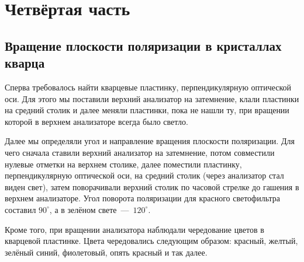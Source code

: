 \documentclass[12pt]{article}
\begin{document}
	\section{Четвёртая часть}
	\subsection{Вращение плоскости поляризации в кристаллах кварца}
	Сперва требовалось найти кварцевые пластинку, перпендикулярную оптической оси. Для этого мы поставили верхний анализатор на затемнение, клали пластинки на средний столик и далее меняли пластинки, пока не нашли ту, при вращении которой в верхнем анализаторе всегда было светло.
	\par Далее мы определяли угол и направление вращения плоскости поляризации. Для чего сначала ставили верхний анализатор на затемнение, потом совместили нулевые отметки на верхнем столике, далее поместили пластинку, перпендикулярную оптической оси, на средний столик (через анализатор стал виден свет), затем поворачивали верхний столик по часовой стрелке до гашения в верхнем анализаторе. Угол поворота поляризации для красного светофильтра составил $90^\circ$, а в зелёном свете~\----~$120^\circ$. 
	\par Кроме того, при вращении анализатора наблюдали чередование цветов в кварцевой пластинке. Цвета чередовались следующим образом: красный, желтый, зелёный синий, фиолетовый, опять красный и так далее.
\end{document}
